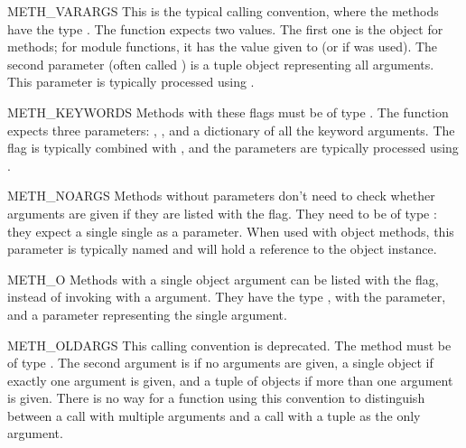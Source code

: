 \begin{datadesc}{METH_VARARGS}
  This is the typical calling convention, where the methods have the
  type . The function expects two
   values.  The first one is the  object for
  methods; for module functions, it has the value given to
   (or \NULL{} if
   was used).  The second parameter
  (often called ) is a tuple object representing all
  arguments. This parameter is typically processed using
  .
\end{datadesc}

\begin{datadesc}{METH_KEYWORDS}
  Methods with these flags must be of type
  .  The function expects three
  parameters: , , and a dictionary of all the
  keyword arguments.  The flag is typically combined with
  , and the parameters are typically processed
  using .
\end{datadesc}

\begin{datadesc}{METH_NOARGS}
  Methods without parameters don't need to check whether arguments are
  given if they are listed with the  flag.  They
  need to be of type : they expect a single
  single  as a parameter.  When used with object
  methods, this parameter is typically named  and will hold
  a reference to the object instance.
\end{datadesc}

\begin{datadesc}{METH_O}
  Methods with a single object argument can be listed with the
   flag, instead of invoking
   with a  argument. They have
  the type , with the  parameter, and a
   parameter representing the single argument.
\end{datadesc}

\begin{datadesc}{METH_OLDARGS}
  This calling convention is deprecated.  The method must be of type
  .  The second argument is \NULL{} if no arguments
  are given, a single object if exactly one argument is given, and a
  tuple of objects if more than one argument is given.  There is no
  way for a function using this convention to distinguish between a
  call with multiple arguments and a call with a tuple as the only
  argument.
\end{datadesc}

